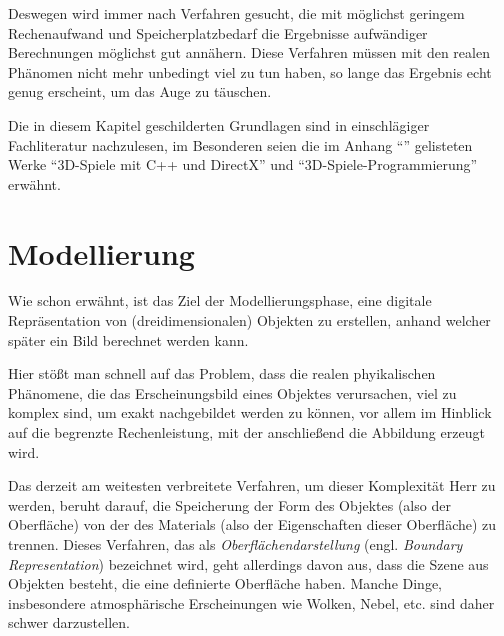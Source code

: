Deswegen wird immer nach Verfahren gesucht, die mit möglichst geringem Rechenaufwand und Speicherplatzbedarf die Ergebnisse aufwändiger Berechnungen möglichst gut annähern. Diese Verfahren müssen mit den realen Phänomen nicht mehr unbedingt viel zu tun haben, so lange das Ergebnis echt genug erscheint, um das Auge zu täuschen.

Die in diesem Kapitel geschilderten Grundlagen sind in einschlägiger Fachliteratur nachzulesen, im Besonderen seien die im Anhang \enquote{\bibname} gelisteten Werke \enquote{3D-Spiele mit C++ und DirectX} \citep{21tage} und \enquote{3D-Spiele-Programmierung} \citep{kompendium} erwähnt.


\section{Modellierung}
Wie schon erwähnt, ist das Ziel der Modellierungsphase, eine digitale Repräsentation von (dreidimensionalen) Objekten zu erstellen, anhand welcher später ein Bild berechnet werden kann.

Hier stößt man schnell auf das Problem, dass die realen phyikalischen Phänomene, die das Erscheinungsbild eines Objektes verursachen, viel zu komplex sind, um exakt nachgebildet werden zu können, vor allem im Hinblick auf die begrenzte Rechenleistung, mit der anschließend die Abbildung erzeugt wird.

Das derzeit am weitesten verbreitete Verfahren, um dieser Komplexität Herr zu werden, beruht darauf, die Speicherung der Form des Objektes (also der Oberfläche) von der des Materials (also der Eigenschaften dieser Oberfläche) zu trennen. Dieses Verfahren, das als \emph{Oberflächendarstellung} (engl. \emph{Boundary Representation}) bezeichnet wird, geht allerdings davon aus, dass die Szene aus Objekten besteht, die eine definierte Oberfläche haben. Manche Dinge, insbesondere atmosphärische Erscheinungen wie Wolken, Nebel, etc. sind daher schwer darzustellen.

